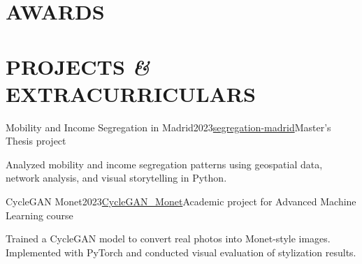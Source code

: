 \documentclass{resume}
\begin{document}
\section{AWARDS}
\begin{content}


\end{content}

\section{PROJECTS \textbf{\em\&} EXTRACURRICULARS} 
\begin{content}

    \begin{position}{Mobility and Income Segregation in Madrid}{2023}{\href{https://github.com/carobs9/segregation-madrid}{segregation-madrid}}{Master's Thesis project}{}
    \item Analyzed mobility and income segregation patterns using geospatial data, network analysis, and visual storytelling in Python.
    \end{position}


    \begin{position}{CycleGAN Monet}{2023}{\href{https://github.com/carobs9/CycleGAN_Monet}{CycleGAN\_Monet}}{Academic project for Advanced Machine Learning course}{}
    \item Trained a CycleGAN model to convert real photos into Monet-style images. Implemented with PyTorch and conducted visual evaluation of stylization results.
    \end{position}
    
\sectionlineskip    
\end{content}
\end{document}
